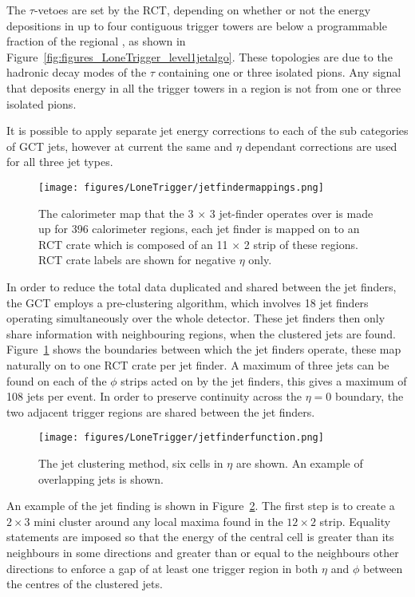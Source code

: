 The $\tau$-vetoes are set by the RCT, depending on whether or not the energy 
depositions in up to four contiguous trigger towers are below a programmable 
fraction of the regional \ET, as shown in 
Figure~\ref{fig:figures_LoneTrigger_level1jetalgo}. These topologies are due to 
the hadronic decay modes of the $\tau$ containing one or three isolated pions. 
Any signal that deposits energy in all the trigger towers in a region is not 
from one or three isolated pions.

It is possible to apply separate jet energy corrections to each of the sub 
categories of GCT jets, however at current the same \ET and $\eta$ dependant 
corrections are used for all three jet types.

\begin{figure}[ht]
  \centering    
  \texttt{[image: figures/LoneTrigger/jetfindermappings.png]}
  \caption{The calorimeter map that the 3 $\times$ 3 jet-finder operates over
   is made up for 396 calorimeter regions, each jet finder is mapped on to an 
   RCT crate which is composed of an 11 $\times$ 2 strip of these regions. RCT
   crate labels are shown for negative $\eta$ only. }
  \label{fig:figures_LoneTrigger_jetfindermappings}
\end{figure}

In order to reduce the total data duplicated and shared between the jet finders,
the GCT employs a pre-clustering algorithm, which involves 18 jet finders 
operating simultaneously over the whole detector. These jet finders then only
share information with neighbouring regions, when the clustered jets are found.
Figure~\ref{fig:figures_LoneTrigger_jetfindermappings} shows the boundaries 
between which the jet finders operate, these map naturally on to one RCT crate 
per jet finder. A maximum of three jets can be found on each of the $\phi$ 
strips acted on by the jet finders, this gives a maximum of 108 jets per event. 
In order to preserve continuity across the $\eta = 0$ boundary, the two adjacent
trigger regions are shared between the jet finders.


\begin{figure}[ht]
  \centering
 \texttt{[image: figures/LoneTrigger/jetfinderfunction.png]}
  \caption{The \Lone jet clustering method, six cells in $\eta$ are shown. An
  example of overlapping jets is shown.\cite{ilesgct}}
  \label{fig:figures_LoneTrigger_jetfinderfunction}
\end{figure}


An example of the jet finding is shown in
Figure~\ref{fig:figures_LoneTrigger_jetfinderfunction}. The first step is to 
create a $2 \times 3$ mini cluster around any local maxima found in the $12 
\times 2$ strip. Equality statements are imposed so that the energy of the 
central cell is greater than its neighbours in some directions and greater than 
or equal to the neighbours other directions to enforce a gap of at least one 
trigger region in both $\eta$ and $\phi$ between the centres of the clustered 
jets.

